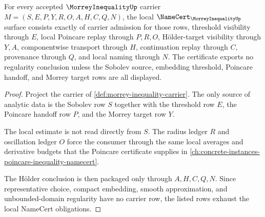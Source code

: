 \begin{theorem}
\label{thm:morrey-inequality-namecert-obligations}
For every accepted $\MorreyInequalityUp$ carrier $M=(S,E,P,Y,R,O,A,H,C,Q,N)$, the local $\NameCert_{\MorreyInequalityUp}$ surface consists exactly of carrier admission for those rows, threshold visibility through $E$, local Poincare replay through $P,R,O$, Hölder-target visibility through $Y,A$, componentwise transport through $H$, continuation replay through $C$, provenance through $Q$, and local naming through $N$. The certificate exports no regularity conclusion unless the Sobolev source, embedding threshold, Poincare handoff, and Morrey target rows are all displayed.
\end{theorem}
\begin{proof}
Project the carrier of \autoref{def:morrey-inequality-carrier}. The only source of analytic data is the Sobolev row $S$ together with the threshold row $E$, the Poincare handoff row $P$, and the Morrey target row $Y$.

The local estimate is not read directly from $S$. The radius ledger $R$ and oscillation ledger $O$ force the consumer through the same local averages and derivative budgets that the Poincare certificate supplies in \autoref{ch:concrete-instances-poincare-inequality-namecert}.

The Hölder conclusion is then packaged only through $A,H,C,Q,N$. Since representative choice, compact embedding, smooth approximation, and unbounded-domain regularity have no carrier row, the listed rows exhaust the local NameCert obligations.
\end{proof}

